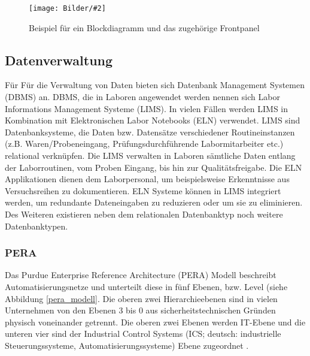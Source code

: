 \documentclass[
fontsize=12pt, 
paper=a4, 
BCOR=10mm, 
twoside=false,
 DIV=10, 
 headsepline, 
 footsepline
 ]{scrartcl}
\def\bild#1#2#3#4#5#6{%
\begin{figure}[h!] %
\centering
\texttt{[image: Bilder/\#2]}
\vspace{#3}
\caption[#4]{#5}\label{#6}
\end{figure}
}
\begin{document}
\bild{0.8}
{blockdiagramm_frontpanel.png}
{-1em}
{Beispiel für ein Blockdiagramm und das zugehörige Frontpanel}
{Beispiel für ein Blockdiagramm und das zugehörige Frontpanel \cite{blockdiagramm_frontpanel}}
{blockdiagramm_frontpanel}

%
\subsection{Datenverwaltung}

Für Für die Verwaltung von Daten bieten sich Datenbank Management Systemen (DBMS) an. DBMS, die in Laboren angewendet werden nennen sich Labor Informations Management Systeme (LIMS). In vielen Fällen werden LIMS in Kombination mit Elektronischen Labor Notebooks (ELN) verwendet. LIMS sind Datenbanksysteme, die Daten bzw. Datensätze verschiedener Routineinstanzen (z.B. Waren/Probeneingang, Prüfungsdurchführende Labormitarbeiter etc.) relational verknüpfen. Die LIMS verwalten in Laboren sämtliche Daten entlang der Laborroutinen, vom Proben Eingang, bis hin zur Qualitätsfreigabe. Die ELN Applikationen dienen dem Laborpersonal, um beispielsweise Erkenntnisse aus Versuchsreihen zu dokumentieren. ELN Systeme können in LIMS integriert werden, um redundante Dateneingaben zu reduzieren oder um sie zu eliminieren. Des Weiteren existieren neben dem relationalen Datenbanktyp noch weitere Datenbanktypen. \\

\subsubsection{PERA}

Das Purdue Enterprise Reference Architecture (PERA) Modell beschreibt Automatisierungsnetze und unterteilt diese in fünf Ebenen, bzw. \glqq Level\grqq{} (siehe  Abbildung \ref{pera_modell}. Die oberen zwei Hierarchieebenen sind in vielen Unternehmen von den Ebenen 3 bis 0 aus sicherheitstechnischen Gründen physisch voneinander getrennt. Die oberen zwei Ebenen werden IT-Ebene und die unteren vier sind der Industrial Control Systems (ICS; deutsch: industrielle Steuerungssysteme, Automatisierungssysteme) Ebene zugeordnet \cite{ics_kompendium}.
\end{document}
